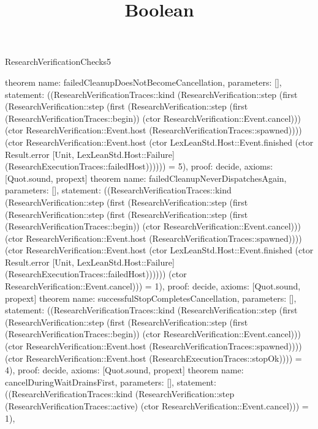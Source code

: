 \begin{lexlean}{ResearchVerificationChecks5}
\title{Boolean}
\begin{semanticmodule}
theorem{
  name: failedCleanupDoesNotBecomeCancellation,
  parameters: [],
  statement: ((ResearchVerificationTraces::kind (ResearchVerification::step (first (ResearchVerification::step (first (ResearchVerification::step (first (ResearchVerificationTraces::begin)) (ctor ResearchVerification::Event.cancel))) (ctor ResearchVerification::Event.host (ResearchVerificationTraces::spawned)))) (ctor ResearchVerification::Event.host (ctor LexLeanStd.Host::Event.finished (ctor Result.error [Unit, LexLeanStd.Host::Failure] (ResearchExecutionTraces::failedHost)))))) = 5),
  proof: decide{},
  axioms: [Quot.sound, propext]
}
theorem{
  name: failedCleanupNeverDispatchesAgain,
  parameters: [],
  statement: ((ResearchVerificationTraces::kind (ResearchVerification::step (first (ResearchVerification::step (first (ResearchVerification::step (first (ResearchVerification::step (first (ResearchVerificationTraces::begin)) (ctor ResearchVerification::Event.cancel))) (ctor ResearchVerification::Event.host (ResearchVerificationTraces::spawned)))) (ctor ResearchVerification::Event.host (ctor LexLeanStd.Host::Event.finished (ctor Result.error [Unit, LexLeanStd.Host::Failure] (ResearchExecutionTraces::failedHost)))))) (ctor ResearchVerification::Event.cancel))) = 1),
  proof: decide{},
  axioms: [Quot.sound, propext]
}
theorem{
  name: successfulStopCompletesCancellation,
  parameters: [],
  statement: ((ResearchVerificationTraces::kind (ResearchVerification::step (first (ResearchVerification::step (first (ResearchVerification::step (first (ResearchVerificationTraces::begin)) (ctor ResearchVerification::Event.cancel))) (ctor ResearchVerification::Event.host (ResearchVerificationTraces::spawned)))) (ctor ResearchVerification::Event.host (ResearchExecutionTraces::stopOk)))) = 4),
  proof: decide{},
  axioms: [Quot.sound, propext]
}
theorem{
  name: cancelDuringWaitDrainsFirst,
  parameters: [],
  statement: ((ResearchVerificationTraces::kind (ResearchVerification::step (ResearchVerificationTraces::active) (ctor ResearchVerification::Event.cancel))) = 1),
}
\end{semanticmodule}
\end{lexlean}
